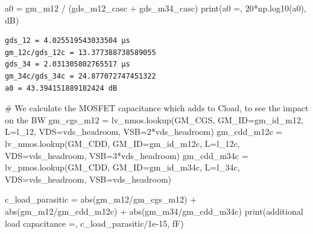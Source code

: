 \documentclass[
  a4paper,
  DIV=11,
  numbers=noendperiod]{scrartcl}
\newenvironment{Shaded}{\begin{snugshade}}{\end{snugshade}}
\newcommand{\BuiltInTok}[1]{\textcolor[rgb]{0.00,0.23,0.31}{#1}}
\newcommand{\CommentTok}[1]{\textcolor[rgb]{0.37,0.37,0.37}{#1}}
\newcommand{\DecValTok}[1]{\textcolor[rgb]{0.68,0.00,0.00}{#1}}
\newcommand{\FloatTok}[1]{\textcolor[rgb]{0.68,0.00,0.00}{#1}}
\newcommand{\NormalTok}[1]{\textcolor[rgb]{0.00,0.23,0.31}{#1}}
\newcommand{\OperatorTok}[1]{\textcolor[rgb]{0.37,0.37,0.37}{#1}}
\newcommand{\StringTok}[1]{\textcolor[rgb]{0.13,0.47,0.30}{#1}}
\begin{document}
\begin{tcolorbox}
\begin{Shaded}
\begin{Highlighting}[]
\NormalTok{a0 }\OperatorTok{=}\NormalTok{ gm\_m12 }\OperatorTok{/}\NormalTok{ (gds\_m12\_casc }\OperatorTok{+}\NormalTok{ gds\_m34\_casc)}
\BuiltInTok{print}\NormalTok{(}\StringTok{\textquotesingle{}a0 =\textquotesingle{}}\NormalTok{, }\DecValTok{20}\OperatorTok{*}\NormalTok{np.log10(a0), }\StringTok{\textquotesingle{}dB\textquotesingle{}}\NormalTok{)}
\end{Highlighting}
\end{Shaded}

\begin{verbatim}
gds_12 = 4.025519543033504 µs
gm_12c/gds_12c = 13.377388738589055
gds_34 = 2.031305802765517 µs
gm_34c/gds_34c = 24.877072747451322
a0 = 43.394151889182424 dB
\end{verbatim}

\begin{Shaded}
\begin{Highlighting}[]
\CommentTok{\# We calculate the MOSFET capacitance which adds to Cload, to see the impact on the BW}
\NormalTok{gm\_cgs\_m12 }\OperatorTok{=}\NormalTok{ lv\_nmos.lookup(}\StringTok{\textquotesingle{}GM\_CGS\textquotesingle{}}\NormalTok{, GM\_ID}\OperatorTok{=}\NormalTok{gm\_id\_m12, L}\OperatorTok{=}\NormalTok{l\_12, VDS}\OperatorTok{=}\NormalTok{vds\_headroom, VSB}\OperatorTok{=}\DecValTok{2}\OperatorTok{*}\NormalTok{vds\_headroom)}
\NormalTok{gm\_cdd\_m12c }\OperatorTok{=}\NormalTok{ lv\_nmos.lookup(}\StringTok{\textquotesingle{}GM\_CDD\textquotesingle{}}\NormalTok{, GM\_ID}\OperatorTok{=}\NormalTok{gm\_id\_m12c, L}\OperatorTok{=}\NormalTok{l\_12c, VDS}\OperatorTok{=}\NormalTok{vds\_headroom, VSB}\OperatorTok{=}\DecValTok{3}\OperatorTok{*}\NormalTok{vds\_headroom)}
\NormalTok{gm\_cdd\_m34c }\OperatorTok{=}\NormalTok{ lv\_pmos.lookup(}\StringTok{\textquotesingle{}GM\_CDD\textquotesingle{}}\NormalTok{, GM\_ID}\OperatorTok{=}\NormalTok{gm\_id\_m34c, L}\OperatorTok{=}\NormalTok{l\_34c, VDS}\OperatorTok{=}\NormalTok{vds\_headroom, VSB}\OperatorTok{=}\NormalTok{vds\_headroom)}

\NormalTok{c\_load\_parasitic }\OperatorTok{=} \BuiltInTok{abs}\NormalTok{(gm\_m12}\OperatorTok{/}\NormalTok{gm\_cgs\_m12) }\OperatorTok{+} \BuiltInTok{abs}\NormalTok{(gm\_m12}\OperatorTok{/}\NormalTok{gm\_cdd\_m12c) }\OperatorTok{+} \BuiltInTok{abs}\NormalTok{(gm\_m34}\OperatorTok{/}\NormalTok{gm\_cdd\_m34c)}
\BuiltInTok{print}\NormalTok{(}\StringTok{\textquotesingle{}additional load capacitance =\textquotesingle{}}\NormalTok{, c\_load\_parasitic}\OperatorTok{/}\FloatTok{1e{-}15}\NormalTok{, }\StringTok{\textquotesingle{}fF\textquotesingle{}}\NormalTok{)}


\end{Highlighting}
\end{Shaded}
\end{tcolorbox}
\end{document}
